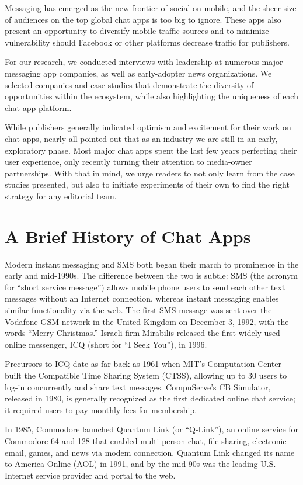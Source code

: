 \documentclass[notoc, symmetric, nobib, nols]{towcenter-guideto-book}
\begin{document}
Messaging has emerged as the new frontier of social on mobile, and the sheer size of audiences on the top global chat apps is too big to ignore. These apps also present an opportunity to diversify mobile traffic sources and to minimize vulnerability should Facebook or other platforms decrease traffic for publishers.

For our research, we conducted interviews with leadership at numerous major messaging app companies, as well as early-adopter news organizations. We selected companies and case studies that demonstrate the diversity of opportunities within the ecosystem, while also highlighting the uniqueness of each chat app platform.  

While publishers generally indicated optimism and excitement for their work on chat apps, nearly all pointed out that as an industry we are still in an early, exploratory phase. Most major chat apps spent the last few years perfecting their user experience, only recently turning their attention to media-owner partnerships. With that in mind, we urge readers to not only learn from the case studies presented, but also to initiate experiments of their own to find the right strategy for any editorial team.  

\section{A Brief History of Chat Apps}

Modern instant messaging and SMS both began their march to prominence in the early and mid-1990s. The difference between the two is subtle: SMS (the acronym for ``short service message'') allows mobile phone users to send each other text messages without an Internet connection, whereas instant messaging enables similar functionality via the web. The first SMS message was sent over the Vodafone GSM network in the United Kingdom on December 3, 1992, with the words ``Merry Christmas.'' Israeli firm Mirabilis released the first widely used online messenger, ICQ (short for ``I Seek You''), in 1996.  

Precursors to ICQ date as far back as 1961 when MIT's Computation Center built the Compatible Time Sharing System (CTSS), allowing up to 30 users to log-in concurrently and share text messages. CompuServe's CB Simulator, released in 1980, is generally recognized as the first dedicated online chat service; it required users to pay monthly fees for membership.  

In 1985, Commodore launched Quantum Link (or ``Q-Link''), an online service for Commodore 64 and 128 that enabled multi-person chat, file sharing, electronic email, games, and news via modem connection. Quantum Link changed its name to America Online (AOL) in 1991, and by the mid-90s was the leading U.S. Internet service provider and portal to the web.  
\end{document}
